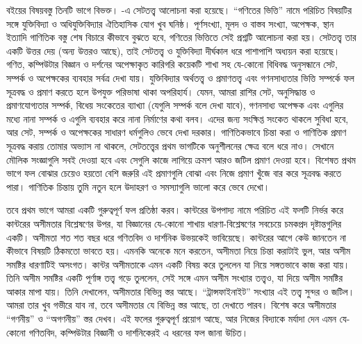 বইয়ের বিষয়বস্তু তিনটি ভাগে বিভক্ত। -এ
সেটতত্ত্ব আলোচনা করা হয়েছে। ``গণিতের ভিত্তি'' নামে পরিচিত বিষয়টির
সঙ্গে যুক্তিবিদ্যা ও অধিযুক্তিবিদ্যার ঐতিহাসিক যোগ খুব ঘনিষ্ঠ।
পূর্ণসংখ্যা, মূলদ ও বাস্তব সংখ্যা, অপেক্ষক, স্থান ইত্যাদি গাণিতিক
বস্তু শেষ বিচারে কীভাবে বুঝতে হবে, গণিতের ভিত্তিতে সেই প্রশ্নটি
আলোচনা করা হয়। সেটতত্ত্ব তার একটি উত্তর দেয় (অন্য উত্তরও আছে),
তাই সেটতত্ত্ব ও যুক্তিবিদ্যা দীর্ঘকাল ধরে পাশাপাশি অধ্যয়ন করা হয়েছে।
গণিত, কম্পিউটার বিজ্ঞান ও দর্শনের অপেক্ষাকৃত কারিগরি কয়েকটি শাখা
সহ যে-কোনো বিধিবদ্ধ অনুসন্ধানে সেট, সম্পর্ক ও অপেক্ষকের ব্যবহার
সর্বত্র দেখা যায়। যুক্তিবিদ্যার অর্থতত্ত্ব ও প্রমাণতত্ত্ব এবং
গণনসাধ্যতার ভিত্তি সম্পর্কে ফল সূত্রবদ্ধ ও প্রমাণ করতে হলে
উপযুক্ত পরিভাষা থাকা অপরিহার্য। যেমন, আমরা রাশির সেট, অনুসিদ্ধান্ত
ও প্রমাণযোগ্যতার সম্পর্ক, বিধেয় সংকেতের ব্যাখ্যা (যেগুলি সম্পর্ক
বলে দেখা যাবে), গণনসাধ্য অপেক্ষক এবং এগুলির মধ্যে নানা সম্পর্ক ও
এগুলি ব্যবহার করে নানা নির্মাণের কথা বলব। এদের জন্য সংক্ষিপ্ত
সংকেত থাকলে সুবিধা হবে, আর সেট, সম্পর্ক ও অপেক্ষকের সাধারণ
ধর্মগুলিও ভেবে দেখা দরকার। গাণিতিকভাবে চিন্তা করা ও গাণিতিক প্রমাণ
সূত্রবদ্ধ করায় তোমার অভ্যাস না থাকলে, সেটতত্ত্বের প্রথম ভাগটিকে
অনুশীলনের ক্ষেত্র বলে ধরে নাও। সেখানে মৌলিক সংজ্ঞাগুলি সবই দেওয়া
হবে এবং সেগুলি কাজে লাগিয়ে ক্রমশ আরও জটিল প্রমাণ দেওয়া হবে।
বিশেষত প্রথম ভাগে ফল বোঝার চেয়েও হয়তো বেশি জরুরি এই প্রমাণগুলি
বোঝা এবং নিজে প্রমাণ খুঁজে বার করে সূত্রবদ্ধ করতে পারা। গাণিতিক
চিন্তায় তুমি নতুন হলে উদাহরণ ও সমস্যাগুলি ভালো করে ভেবে দেখো।

তবে প্রথম ভাগে আমরা একটি গুরুত্বপূর্ণ ফল প্রতিষ্ঠা করব। কান্টরের
উপপাদ্য নামে পরিচিত এই ফলটি নির্ভর করে কান্টরের অসীমতার বিশ্লেষণের
উপর, যা বিজ্ঞানের যে-কোনো শাখায় ধারণা-বিশ্লেষণের সবচেয়ে চমকপ্রদ
দৃষ্টান্তগুলির একটি। অসীমতা শত শত বছর ধরে গণিতবিদ ও দার্শনিক
উভয়কেই ভাবিয়েছে। কান্টরের আগে কেউ জানতেন না কীভাবে বিষয়টি
ঠিকমতো ভাবতে হয়। এমনকি অনেকে মনে করতেন, অসীমতা নিয়ে চিন্তা
করাটাই ভুল, আর অসীম সমষ্টির ধারণাটিই অসংগত। কান্টর অসীমতাকে
এমন একটি বিষয় করে তুললেন যা নিয়ে সঙ্গতভাবে কাজ করা যায়। তিনি
অসীম সমষ্টির একটি পূর্ণাঙ্গ তত্ত্ব গড়ে তুললেন, সেই সঙ্গে এমন অসীম
সংখ্যার তত্ত্বও, যা দিয়ে অসীম সমষ্টির আকার মাপা যায়। তিনি দেখালেন,
অসীমতার বিভিন্ন স্তর আছে। ``ট্রান্সফাইনাইট'' সংখ্যার এই তত্ত্ব
সুন্দর ও জটিল। আমরা তার খুব গভীরে যাব না, তবে অসীমতার যে বিভিন্ন
স্তর আছে, তা দেখাতে পারব। বিশেষ করে অসীমতার ``গণনীয়'' ও
``অগণনীয়'' স্তর দেখব। এই ফলের গুরুত্বপূর্ণ প্রয়োগ আছে, আর
নিজের বিদ্যাকে মর্যাদা দেন এমন যে-কোনো গণিতবিদ, কম্পিউটার বিজ্ঞানী
ও দার্শনিকেরই এ ধরনের ফল জানা উচিত।


